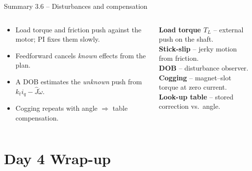 \documentclass[aspectratio=169,10pt]{beamer}
\begin{document}
\begin{frame}{Summary 3.6 -- Disturbances and compensation}
\begin{columns}[T,onlytextwidth]
\begin{keybox}
\small
\begin{itemize}
\item Load torque and friction push against the motor; PI fixes them slowly.
\item Feedforward cancels \emph{known} effects from the plan.
\item A DOB estimates the \emph{unknown} push from $k_ti_q-\hat J\dot\omega$.
\item Cogging repeats with angle $\Rightarrow$ table compensation.
\end{itemize}
\end{keybox}
\begin{defbox}
\small
\textbf{Load torque $T_L$} -- external push on the shaft.\\
\textbf{Stick-slip} -- jerky motion from friction.\\
\textbf{DOB} -- disturbance observer.\\
\textbf{Cogging} -- magnet--slot torque at zero current.\\
\textbf{Look-up table} -- stored correction vs.\ angle.
\end{defbox}
\end{columns}
\end{frame}

\section{Day 4 Wrap-up}
\end{document}
